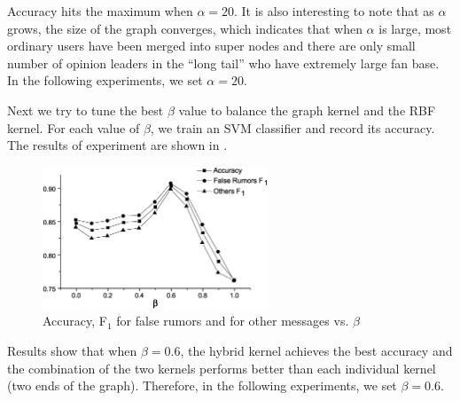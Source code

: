 Accuracy hits the maximum when $\alpha = 20$.
It is also interesting to note that as $\alpha$ grows, the size of the graph
converges, which indicates that when $\alpha$ is large, most ordinary users
have been merged into super nodes and there are only small number of
opinion leaders in the ``long tail'' who have extremely large fan base.
In the following experiments, we set $\alpha = 20$.

Next we try to tune the best $\beta$ value to balance the graph kernel and
the RBF kernel.
For each value of $\beta$, we train an SVM classifier
and record its accuracy. The results of experiment are shown in
.
\begin{figure}[htb]
\centering
\includegraphics[height=120pt]{impact-beta.eps}
\caption{Accuracy, F$_1$ for false rumors and for other messages vs. $\beta$}
\label{fig:result-beta}
\end{figure}

Results show that when $\beta=0.6$, the hybrid kernel achieves the best accuracy
and the combination of the two kernels performs better than each individual
kernel (two ends of the graph). Therefore, in the following experiments,
we set $\beta = 0.6$.
